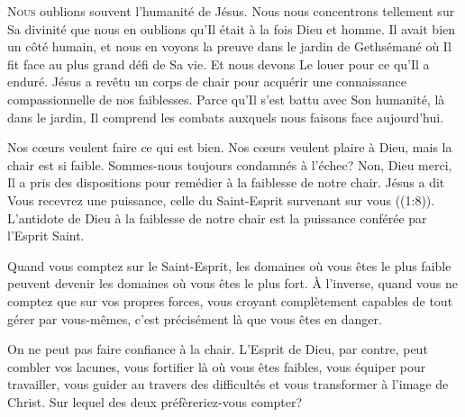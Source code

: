 




\lettrine{N}{ous} oublions souvent l'humanité de Jésus.
 Nous nous concentrons tellement sur Sa divinité que nous en oublions
 qu'Il était à la fois Dieu et homme. Il avait bien un côté humain,
 et nous en voyons la preuve dans le jardin de Gethsémané
 \ocadr où Il fit face au plus grand défi de Sa vie.
 Et nous devons Le  louer pour ce qu'Il a enduré.
 Jésus a revêtu un corps de chair pour acquérir une connaissance
 compassionnelle de nos faiblesses. Parce qu'Il s'est battu avec Son humanité,
 là dans le jardin, Il comprend les combats auxquels nous faisons
 face aujourd'hui.

Nos c\oe{}urs veulent faire ce qui est bien.
 Nos c\oe{}urs veulent plaire à Dieu, mais la chair est si faible.
 Sommes-nous toujours condamnés à l'échec? Non, Dieu merci,
 Il a pris des dispositions pour remédier à la faiblesse de notre chair.
 Jésus a dit\frcolon{} 
 \Og Vous recevrez une puissance, celle du Saint-Esprit survenant sur vous \Fg{}
 ((1:8)).
 L'antidote de Dieu à la faiblesse de notre chair
 est la puissance conférée par l'Esprit Saint.


Quand vous comptez sur le Saint-Esprit, les domaines où vous êtes
 le plus faible peuvent devenir les domaines où vous êtes le plus fort.
 À l'inverse, quand vous ne comptez que sur vos propres forces,
 vous croyant complètement capables de tout gérer par vous-mêmes,
 c'est précisément là que vous êtes en danger.

On ne peut pas faire confiance à la chair.
 L'Esprit de Dieu, par contre, peut combler vos lacunes,
 vous fortifier là où vous êtes faibles, vous équiper pour travailler,
 vous guider au travers des difficultés et vous transformer
 à l'image de Christ. Sur lequel des deux préfèreriez-vous compter?


